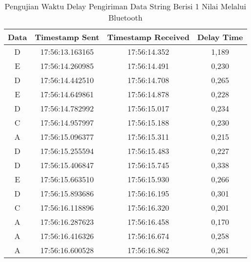 \begin{table}[]
\centering
  \caption{Pengujian Waktu Delay Pengiriman Data String Berisi 1 Nilai Melalui Bluetooth}
  \label{tbl:delayBluetooth1}
  \begin{tabular}{|ccc|c|}
  \hline
  \multicolumn{1}{|c|}{Data} & \multicolumn{1}{c|}{Timestamp Sent}  & Timestamp Received & Delay Time   \\ \hline
  \multicolumn{1}{|c|}{D}    & \multicolumn{1}{c|}{17:56:13.163165} & 17:56:14.352       & 1,189        \\ \hline
  \multicolumn{1}{|c|}{E}    & \multicolumn{1}{c|}{17:56:14.260985} & 17:56:14.491       & 0,230        \\ \hline
  \multicolumn{1}{|c|}{D}    & \multicolumn{1}{c|}{17:56:14.442510} & 17:56:14.708       & 0,265        \\ \hline
  \multicolumn{1}{|c|}{E}    & \multicolumn{1}{c|}{17:56:14.649861} & 17:56:14.878       & 0,228        \\ \hline
  \multicolumn{1}{|c|}{D}    & \multicolumn{1}{c|}{17:56:14.782992} & 17:56:15.017       & 0,234        \\ \hline
  \multicolumn{1}{|c|}{C}    & \multicolumn{1}{c|}{17:56:14.957997} & 17:56:15.188       & 0,230        \\ \hline
  \multicolumn{1}{|c|}{A}    & \multicolumn{1}{c|}{17:56:15.096377} & 17:56:15.311       & 0,215        \\ \hline
  \multicolumn{1}{|c|}{D}    & \multicolumn{1}{c|}{17:56:15.255594} & 17:56:15.483       & 0,227        \\ \hline
  \multicolumn{1}{|c|}{D}    & \multicolumn{1}{c|}{17:56:15.406847} & 17:56:15.745       & 0,338        \\ \hline
  \multicolumn{1}{|c|}{E}    & \multicolumn{1}{c|}{17:56:15.663510} & 17:56:15.930       & 0,266        \\ \hline
  \multicolumn{1}{|c|}{D}    & \multicolumn{1}{c|}{17:56:15.893686} & 17:56:16.195       & 0,301        \\ \hline
  \multicolumn{1}{|c|}{C}    & \multicolumn{1}{c|}{17:56:16.118896} & 17:56:16.320       & 0,201        \\ \hline
  \multicolumn{1}{|c|}{A}    & \multicolumn{1}{c|}{17:56:16.287623} & 17:56:16.458       & 0,170        \\ \hline
  \multicolumn{1}{|c|}{A}    & \multicolumn{1}{c|}{17:56:16.416326} & 17:56:16.674       & 0,258        \\ \hline
  \multicolumn{1}{|c|}{A}    & \multicolumn{1}{c|}{17:56:16.600528} & 17:56:16.862       & 0,261        \\ \hline

\end{tabular}
\end{table}
